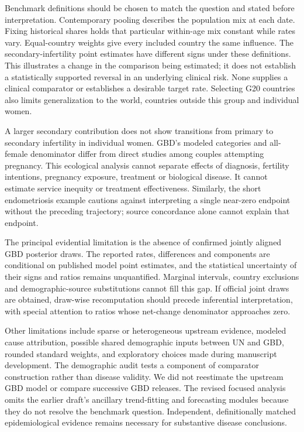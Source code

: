\documentclass[11pt,a4paper]{article}
\begin{document}
Benchmark definitions should be chosen to match the question and stated before interpretation. Contemporary pooling describes the population mix at each date. Fixing historical shares holds that particular within-age mix constant while rates vary. Equal-country weights give every included country the same influence. The secondary-infertility point estimates have different signs under these definitions. This illustrates a change in the comparison being estimated; it does not establish a statistically supported reversal in an underlying clinical risk. None supplies a clinical comparator or establishes a desirable target rate. Selecting G20 countries also limits generalization to the world, countries outside this group and individual women.

A larger secondary contribution does not show transitions from primary to secondary infertility in individual women. GBD's modeled categories and all-female denominator differ from direct studies among couples attempting pregnancy. This ecological analysis cannot separate effects of diagnosis, fertility intentions, pregnancy exposure, treatment or biological disease. It cannot estimate service inequity or treatment effectiveness. Similarly, the short endometriosis example cautions against interpreting a single near-zero endpoint without the preceding trajectory; source concordance alone cannot explain that endpoint.

The principal evidential limitation is the absence of confirmed jointly aligned GBD posterior draws. The reported rates, differences and components are conditional on published model point estimates, and the statistical uncertainty of their signs and ratios remains unquantified. Marginal intervals, country exclusions and demographic-source substitutions cannot fill this gap. If official joint draws are obtained, draw-wise recomputation should precede inferential interpretation, with special attention to ratios whose net-change denominator approaches zero.

Other limitations include sparse or heterogeneous upstream evidence, modeled cause attribution, possible shared demographic inputs between UN and GBD, rounded standard weights, and exploratory choices made during manuscript development. The demographic audit tests a component of comparator construction rather than disease validity. We did not reestimate the upstream GBD model or compare successive GBD releases. The revised focused analysis omits the earlier draft's ancillary trend-fitting and forecasting modules because they do not resolve the benchmark question. Independent, definitionally matched epidemiological evidence remains necessary for substantive disease conclusions.
\end{document}
